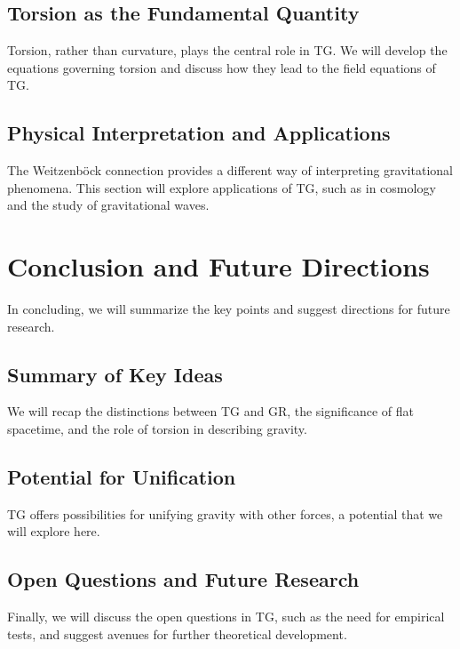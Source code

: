 \documentclass[12pt]{article}
\begin{document}
\subsection{Torsion as the Fundamental Quantity}
Torsion, rather than curvature, plays the central role in TG. We will develop the equations governing torsion and discuss how they lead to the field equations of TG.

\subsection{Physical Interpretation and Applications}
The Weitzenböck connection provides a different way of interpreting gravitational phenomena. This section will explore applications of TG, such as in cosmology and the study of gravitational waves.

\section{Conclusion and Future Directions}
In concluding, we will summarize the key points and suggest directions for future research.

\subsection{Summary of Key Ideas}
We will recap the distinctions between TG and GR, the significance of flat spacetime, and the role of torsion in describing gravity.

\subsection{Potential for Unification}
TG offers possibilities for unifying gravity with other forces, a potential that we will explore here.

\subsection{Open Questions and Future Research}
Finally, we will discuss the open questions in TG, such as the need for empirical tests, and suggest avenues for further theoretical development.

\newpage


\end{document}
